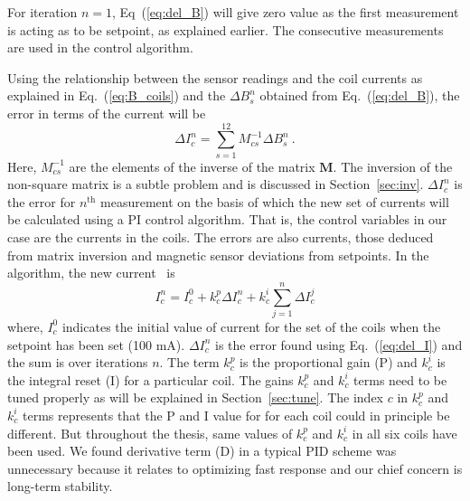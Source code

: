 For iteration $n=1$, Eq~(\ref{eq:del_B}) will give zero value as the first measurement is acting as to be setpoint, as explained earlier. The consecutive measurements are used in the control algorithm. 

Using the relationship between the sensor readings and the coil currents as explained in Eq.~(\ref{eq:B_coils}) and the $\Delta B_s^n$ obtained from Eq.~(\ref{eq:del_B}), the error in terms of the current  will be
\begin{equation}\label{eq:del_I}
    \Delta I_c^n =\sum_{s=1}^{12} M^{-1}_{cs} \Delta B_s^n~\text{.}
\end{equation}
Here, $M^{-1}_{cs}$ are the elements of the inverse of the matrix $\bm{M}$. The inversion of the non-square matrix is a subtle problem and is discussed in Section~\ref{sec:inv}. $\Delta I_c^n$ is the error for $n^{\mathrm{th}}$ measurement on the basis of which the new set of currents will be calculated using a PI control algorithm. That is, the control variables in our case are the currents in the coils. The errors are also currents, those deduced from matrix inversion and magnetic sensor deviations from setpoints. In the algorithm, the new current~\cite{bea} is
\begin{equation}\label{eq:I}
    I^n_c=I^0_c+k^p_c \Delta I_c^n+k^i_c\sum_{j=1}^n \Delta I_c^j
\end{equation}
where, $I^0_c$ indicates the initial value of current for the set of the coils when the setpoint has been set (100 mA). $\Delta I_c^n$ is the error found using Eq.~(\ref{eq:del_I}) and the sum is over iterations $n$. The term $k^p_c$ is the proportional gain (P) and $k^i_c$ is the integral reset (I) for a particular coil. The gains $k^p_c$ and $k^i_c$ terms need to be tuned properly as will be explained in Section~\ref{sec:tune}. The index $c$ in $k^p_c$ and $k^i_c$ terms represents that the P and I value for for each coil could in principle be different. But throughout the thesis, same values of $k_c^p$ and $k_c^i$ in all six coils have been used. We found derivative term (D) in a typical PID scheme was unnecessary because it relates to optimizing fast response and our chief concern is long-term stability.


